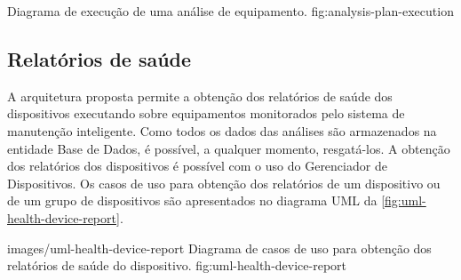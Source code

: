  {Diagrama de execução de uma análise de equipamento.}
  {fig:analysis-plan-execution}


%
%


\subsection{Relatórios de saúde}

A arquitetura proposta permite a obtenção dos relatórios de saúde dos dispositivos executando sobre
equipamentos monitorados pelo sistema de manutenção inteligente. Como todos os dados das análises
são armazenados na entidade Base de Dados, é possível, a qualquer momento, resgatá-los. A obtenção
dos relatórios dos dispositivos é possível com o uso do Gerenciador de Dispositivos. Os casos de uso
para obtenção dos relatórios de um dispositivo ou de um grupo de dispositivos são apresentados no
diagrama \gls{UML} da \cref{fig:uml-health-device-report}.

  {images/uml-health-device-report}
  {Diagrama de casos de uso para obtenção dos relatórios de saúde do dispositivo.}
  {fig:uml-health-device-report}
